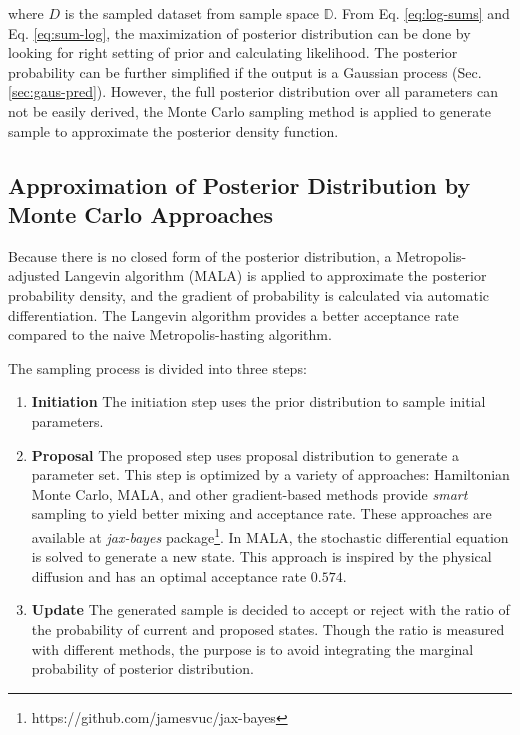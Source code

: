 \documentclass{article}
\begin{document}
where $D$ is the sampled dataset from sample space $\mathbb{D}$. From Eq. \ref{eq:log-sums} and Eq. \ref{eq:sum-log}, the maximization of posterior distribution can be done by looking for right setting of prior and calculating likelihood. The posterior probability can be further simplified if the output is a Gaussian process (Sec. \ref{sec:gaus-pred}). However, the full posterior distribution over all parameters can not be easily derived, the Monte Carlo sampling method is applied to generate sample to approximate the posterior density function. 

\subsection{Approximation of Posterior Distribution by Monte Carlo Approaches}

Because there is no closed form of the posterior distribution, a Metropolis-adjusted Langevin algorithm (MALA) is applied to approximate the posterior probability density, and the gradient of probability is calculated via automatic differentiation. The Langevin algorithm provides a better acceptance rate compared to the naive Metropolis-hasting algorithm\cite{roberts1998optimal}. 

The sampling process is divided into three steps:

\begin{enumerate}
    \item \textbf{Initiation} The initiation step uses the prior distribution to sample initial parameters.
    \item \textbf{Proposal} The proposed step uses proposal distribution to generate a  parameter set. This step is optimized by a variety of approaches\cite{jospin2022a}: Hamiltonian Monte Carlo\cite{neal1996, neal2011}, MALA, and other gradient-based methods provide \textit{smart} sampling to yield better mixing and acceptance rate. These approaches are available at \textit{jax-bayes} package\footnote{https://github.com/jamesvuc/jax-bayes}. In MALA, the stochastic differential equation is solved to generate a new state. This approach is inspired by the physical diffusion and has an optimal acceptance rate $0.574$\cite{roberts1998optimal}.
    \item \textbf{Update} The generated sample is decided to accept or reject with the ratio of the probability of current and proposed states. Though the ratio is measured with different methods, the purpose is to avoid integrating the marginal probability of posterior distribution.
\end{enumerate}
\end{document}
